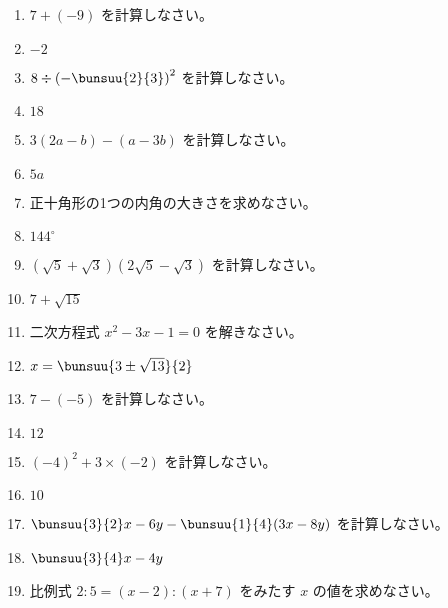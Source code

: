 \documentclass[uplatex,a4j,11pt]{jsreport}
\begin{document}
\begin{multicols}{2}
\begin{enumerate}
    \item $7+(-9)$ を計算しなさい。%
    \item $-2$
    \item $8\div\left(-\bunsuu{2}{3}\right)^2$ を計算しなさい。%
    \item $18$
    \item $3(2a-b)-(a-3b)$ を計算しなさい。%
    \item $5a$
    \item 正十角形の1つの内角の大きさを求めなさい。%
    \item $144^\circ$
    \item $(\sqrt{5}+\sqrt{3})(2\sqrt{5}-\sqrt{3})$ を計算しなさい。%
    \item $7+\sqrt{15}$
    \item 二次方程式 $x^2-3x-1=0$ を解きなさい。%
    \item $x=\bunsuu{3\pm\sqrt{13}}{2}$
    \item $7-(-5)$ を計算しなさい。%
    \item $12$
    \item $(-4)^2+3\times(-2)$ を計算しなさい。%
    \item $10$
    \item $\bunsuu{3}{2}x-6y-\bunsuu{1}{4}(3x-8y)$ を計算しなさい。%
    \item $\bunsuu{3}{4}x-4y$
    \item 比例式 $2:5=(x-2):(x+7)$ をみたす $x$ の値を求めなさい。%

\end{enumerate}
\end{multicols}
\end{document}
